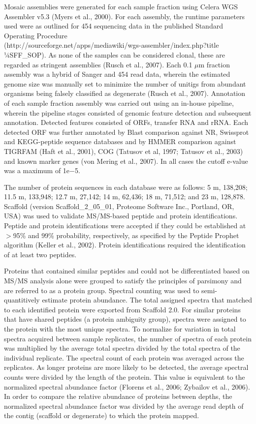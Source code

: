 Mosaic assemblies were generated for each sample fraction using Celera WGS Assembler v5.3 (Myers et al., 2000). 
For each assembly, the runtime parameters used were as outlined for 454 sequencing data in the published Standard Operating Procedure\\ 
(http://sourceforge.net/apps/mediawiki/wgs-assembler/index.php?title 1⁄4SFF\_SOP). 
As none of the samples can be considered clonal, these are regarded as stringent assemblies (Rusch et al., 2007). 
Each 0.1 $\mu$m fraction assembly was a hybrid of Sanger and 454 read data, wherein the estimated genome size was manually set to minimize the number of unitigs from abundant organisms being falsely classified as degenerate (Rusch et al., 2007). 
Annotation of each sample fraction assembly was carried out using an in-house pipeline, wherein the pipeline stages consisted of genomic feature detection and subsequent annotation. 
Detected features consisted of ORFs, transfer RNA and rRNA. Each detected ORF was further annotated by Blast comparison against NR, Swissprot and KEGG-peptide sequence databases and by HMMER comparison against TIGRFAM (Haft et al., 2001), COG (Tatusov et al, 1997; Tatusov et al., 2003) and known marker genes (von Mering et al., 2007).
In all cases the cutoff e-value was a maximum of 1e$-$5. 

The number of protein sequences in each database were as follows: 5 m, 138,208; 11.5 m, 133,948; 12.7 m, 27,142; 14 m, 62,436; 18 m, 71,512; and 23 m, 128,878. 
Scaffold (version Scaffold\_2\_05\_01, Proteome Software Inc., Portland, OR, USA) was used to validate MS/MS-based peptide and protein identifications. 
Peptide and protein identifications were accepted if they could be established at $>$95\% and 99\% probability, respectively, as specified by the Peptide Prophet algorithm (Keller et al., 2002). 
Protein identifications required the identification of at least two peptides.
 
Proteins that contained similar peptides and could not be differentiated based on MS/MS analysis alone were grouped to satisfy the principles of parsimony and are referred to as a protein group. 
Spectral counting was used to semi-quantitively estimate protein abundance. 
The total assigned spectra that matched to each identified protein were exported from Scaffold 2.0. 
For similar proteins that have shared peptides (a protein ambiguity group), spectra were assigned to the protein with the most unique spectra. 
To normalize for variation in total spectra acquired between sample replicates, the number of spectra of each protein was multiplied by the average total spectra divided by the total spectra of the individual replicate. 
The spectral count of each protein was averaged across the replicates. 
As longer proteins are more likely to be detected, the average spectral counts were divided by the length of the protein. 
This value is equivalent to the normalized spectral abundance factor (Florens et al., 2006; Zybailov et al., 2006). 
In order to compare the relative abundance of proteins between depths, the normalized spectral abundance factor was divided by the average read depth of the contig (scaffold or degenerate) to which the protein mapped. 

